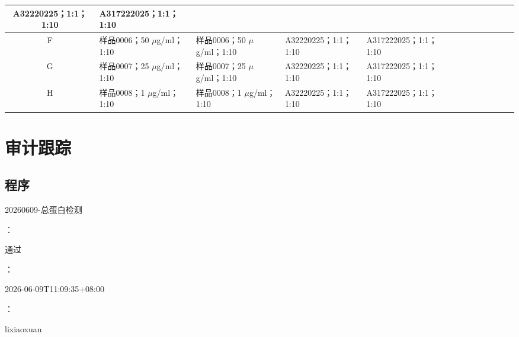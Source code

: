 \documentclass[UTF8,10pt,a4paper,fontset=fandol]{ctexart}
\newcommand{\fieldvalue}[1]{#1}
\begin{document}
\begin{center}
\begin{tabular}{c|p{1.25cm}|p{1.25cm}|p{1.25cm}|p{1.25cm}|p{1.25cm}|p{1.25cm}|p{1.25cm}|p{1.25cm}|p{1.25cm}|p{1.25cm}|p{1.25cm}|p{1.25cm}}
\fieldvalue{A32220225；1:1；1:10} &
\fieldvalue{A317222025；1:1；1:10} & & & & & & & & \\ \hline
F &
\fieldvalue{样品0006；50 $\mu$g/ml；1:10} &
\fieldvalue{样品0006；50 $\mu$g/ml；1:10} &
\fieldvalue{A32220225；1:1；1:10} &
\fieldvalue{A317222025；1:1；1:10} & & & & & & & & \\ \hline
G &
\fieldvalue{样品0007；25 $\mu$g/ml；1:10} &
\fieldvalue{样品0007；25 $\mu$g/ml；1:10} &
\fieldvalue{A32220225；1:1；1:10} &
\fieldvalue{A317222025；1:1；1:10} & & & & & & & & \\ \hline
H &
\fieldvalue{样品0008；1 $\mu$g/ml；1:10} &
\fieldvalue{样品0008；1 $\mu$g/ml；1:10} &
\fieldvalue{A32220225；1:1；1:10} &
\fieldvalue{A317222025；1:1；1:10} & & & & & & & &
\end{tabular}
\end{center}

\section*{审计跟踪}

\subsection*{程序}


\fieldvalue{20260609-总蛋白检测}

：

\fieldvalue{通过}

：

\fieldvalue{2026-06-09T11:09:35+08:00}

：

\fieldvalue{lixiaoxuan}
\end{document}
